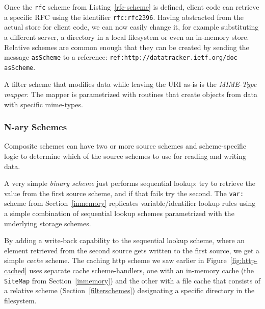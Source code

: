 \documentclass{acm_proc_article-sp}
\begin{document}
Once the {\tt rfc} scheme from Listing~\ref{rfc-scheme} is defined, client code can 
retrieve a specific RFC using the identifier {\tt  rfc:rfc2396}.  Having abstracted
from the actual store for client code, we can now easily change it, for example
substituting a different server, a directory in a local filesystem or even an 
in-memory store.  Relative schemes are common enough that they can be
created by sending the message {\tt asScheme} to a reference: {\tt ref:http://datatracker.ietf.org/doc asScheme}.




A filter scheme that modifies data while leaving the URI as-is is the \emph{MIME-Type mapper}.
The mapper is parametrized with routines that create objects from data with specific
mime-types.  


\subsubsection{N-ary Schemes}

Composite schemes can have two or more source schemes and scheme-specific logic
to determine which of the source schemes to use for reading and writing data.

A very simple \emph{binary scheme} just performs sequential lookup:  try to
retrieve the value from the first source scheme, and if that fails try the second.
The {\tt var:} scheme from Section~\ref{inmemory}  replicates variable/identifier
lookup rules using a simple combination of sequential lookup schemes parametrized
with the underlying storage schemes.

By adding a write-back capability to the sequential lookup scheme, where an element
retrieved from the second source gets written to the first source, we get a simple \emph{cache} scheme.  
The caching http scheme we saw earlier in Figure~\ref{fig:http-cached} uses
separate cache scheme-handlers, one with an in-memory cache (the {\tt SiteMap} from Section~\ref{inmemory})
and the other with a file cache that consists of a relative scheme (Section~\ref{filterschemes}) 
designating a specific directory in the filesystem.
\end{document}
